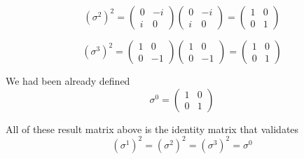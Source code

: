 \documentclass[letter]{article}
\begin{document}
\[
	(\sigma^{2})^2 = 
	\begin{pmatrix} 0 & -i \\ i & 0 \end{pmatrix} 
	\begin{pmatrix} 0 & -i \\ i & 0 \end{pmatrix}  = 
	\begin{pmatrix} 1 & 0 \\ 0 & 1 \end{pmatrix} 
\]

\[
	(\sigma^{3})^2 =
	\begin{pmatrix} 1 & 0 \\ 0 & -1 \end{pmatrix} 
	\begin{pmatrix} 1 & 0 \\ 0 & -1 \end{pmatrix}  = 
	\begin{pmatrix} 1 & 0 \\ 0 & 1 \end{pmatrix} 
\]

We had been already defined 
\[
\sigma^{0} = 
	\begin{pmatrix} 1 & 0 \\ 0 & 1 \end{pmatrix} 
\] 

All of these result matrix above is the identity matrix that validates 
\[
	(\sigma ^{1})^2 = (\sigma ^{2})^2 = (\sigma ^{3})^2 = \sigma^0
\]
\end{document}
